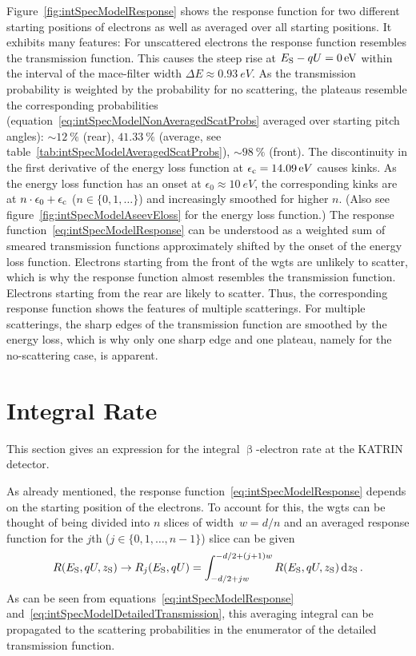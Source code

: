 Figure~\ref{fig:intSpecModelResponse} shows the response function for two different starting positions of electrons as well as averaged over all starting positions. It exhibits many features: For unscattered electrons the response function resembles the transmission function. This causes the steep rise at $E_\mathrm{S}-qU=\SI{0}{eV}$ within the interval of the \gls{mace}-filter width $\Delta E\approx\SI{0.93}{eV}$. As the transmission probability is weighted by the probability for no scattering, the plateaus resemble the corresponding probabilities (equation~\ref{eq:intSpecModelNonAveragedScatProbs} averaged over starting pitch angles): $\sim\SI{12}{\percent}$ (rear), $\SI{41.33}{\percent}$ (average, see table~\ref{tab:intSpecModelAveragedScatProbs}), $\sim\SI{98}{\percent}$ (front).
The discontinuity in the first derivative of the energy loss function at $\epsilon_\mathrm{c}=\SI{14.09}eV$ causes kinks. As the energy loss function has an onset at $\epsilon_0\approx\SI{10}{eV}$, the corresponding kinks are at $n\cdot\epsilon_0+\epsilon_\mathrm{c}$ ($n\in\{0,1,\dots\}$) and increasingly smoothed for higher $n$. (Also see figure~\ref{fig:intSpecModelAseevEloss} for the energy loss function.) 
The response function~\eqref{eq:intSpecModelResponse} can be understood as a weighted sum of smeared transmission functions approximately shifted by the onset of the energy loss function. Electrons starting from the front of the \gls{wgts} are unlikely to scatter, which is why the response function almost resembles the transmission function. Electrons starting from the rear are likely to scatter. Thus, the corresponding response function shows the features of multiple scatterings. For multiple scatterings, the sharp edges of the transmission function are smoothed by the energy loss, which is why only one sharp edge and one plateau, namely for the no-scattering case, is apparent.

\section{Integral Rate}
\label{sec:intSpecModelIntegralRate}
This section gives an expression for the integral $\upbeta$-electron rate at the KATRIN detector. 

As already mentioned, the response function~\eqref{eq:intSpecModelResponse} depends on the starting position of the electrons. To account for this, the \gls{wgts} can be thought of being divided into $n$ slices of width~$w=d/n$ and an averaged response function for the $j$th ($j\in\{0,1,\dots,n-1\}$) slice can be given
\begin{equation}
	R(E_\mathrm{S},qU,z_\mathrm{S}) \rightarrow
	R_j(E_\mathrm{S},qU) =
	\int_{-d/2+jw}^{-d/2+(j+1)w}
		R(E_\mathrm{S},qU,z_\mathrm{S})
	\mathop{}\!\mathrm{d} z_\mathrm{S}
	\text{\,.}
\end{equation}
As can be seen from equations~\eqref{eq:intSpecModelResponse} and~\eqref{eq:intSpecModelDetailedTransmission}, this averaging integral can be propagated to the scattering probabilities in the enumerator of the detailed transmission function.

